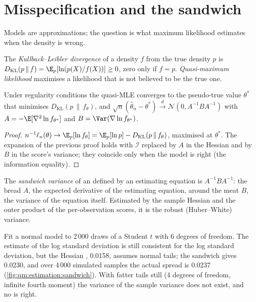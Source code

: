 \section{Misspecification and the sandwich}

Models are approximations; the question is what maximum likelihood estimates when the density is wrong.

\begin{definition}\label{def:qm:estimation:kl}
The \emph{Kullback--Leibler divergence} of a density $f$ from the true density $p$
is $D_{\mathrm{KL}}(p\,\|\,f) = \E_p[\ln(p(X)/f(X))] \ge 0$, zero only if $f = p$. \emph{Quasi-maximum
likelihood} maximises a likelihood that is not believed to be the true one.
\end{definition}

\begin{proposition}\label{prop:qm:estimation:qmle}
Under regularity conditions the quasi-MLE converges to the pseudo-true value $\theta^*$ that minimises $D_{\mathrm{KL}}(p\,\|\,f_\theta)$,
and $\sqrt n(\hat\theta_n - \theta^*) \xrightarrow{d} \mathcal N(0, A^{-1}BA^{-1})$ with $A = -\E[\nabla^2\ln f_{\theta^*}]$ and $B = \Var(\nabla\ln
f_{\theta^*})$.
\end{proposition}

\begin{proof}
$n^{-1}\ell_n(\theta) \to \E_p[\ln f_\theta] = \E_p[\ln p] - D_{\mathrm{KL}}(p\,\|\,f_\theta)$, maximised at $\theta^*$. The expansion of the
previous proof holds with $\mathcal I$ replaced by $A$ in the Hessian and by $B$ in the score's variance; they coincide only when
the model is right (the information equality).
\end{proof}

\begin{definition}\label{def:qm:estimation:sandwich}
The \emph{sandwich variance} of an  defined by an estimating equation is $A^{-1}BA^{-1}$:
the bread $A$, the expected derivative of the estimating equation, around the meat $B$, the variance of the equation
itself. Estimated by the sample Hessian and the outer product of the per-observation scores, it is the robust
(Huber--White) variance.
\end{definition}

Fit a normal model to 2\,000 draws of a Student $t$ with 6 degrees of freedom. The estimate of the log standard
deviation is still consistent for the log standard deviation, but the Hessian , 0.0158, assumes normal
tails; the sandwich gives 0.0230, and over 4\,000 simulated samples the actual spread is 0.0237
(\cref{fig:qm:estimation:sandwich}). With fatter tails still (4 degrees of freedom, infinite fourth moment) the
variance of the sample variance does not exist, and no  is right.

